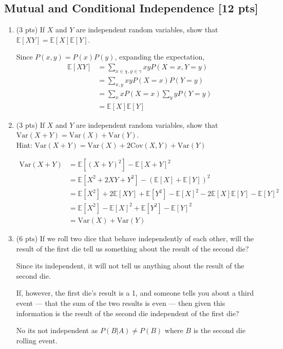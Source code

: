\documentclass[a4paper]{article}
\theoremstyle{definition}
\newcommand{\Var}{\mathrm{Var}}
\newcommand{\Cov}{\mathrm{Cov}}
\newenvironment{soln}{
	\leavevmode\color{blue}\ignorespaces
}{}
\begin{document}
	\subsection{Mutual and Conditional Independence [12 pts]}
	\begin{enumerate}
		\item (3 pts) If $X$ and $Y$ are independent random variables, show that
		$\mathbb{E}[XY] = \mathbb{E}[X]\mathbb{E}[Y]$.
		
		\begin{soln}
			Since $P(x,y) = P(x)P(y)$, expanding the expectation, 
			\begin{align*}
				\mathbb{E}[XY] &= \sum_{x \in \chi,y  \in \gamma} xyP(X=x, Y=y) \\
				&= \sum_{x,y} xyP(X=x)P(Y=y) \\
				&= \sum_{x} xP(X=x) \sum_{y} yP(Y=y) \\
				&= \mathbb{E}[X]\mathbb{E}[Y]
			\end{align*}
		\end{soln}
		
		\item (3 pts) If $X$ and $Y$ are independent random variables, show that
		$\Var(X+Y) = \Var(X) + \Var(Y)$. \\
		Hint: $\Var(X+Y) = \Var(X) + 2\Cov(X, Y) + \Var(Y)$
		
		\begin{soln}
			\begin{align*}
				\Var(X+Y) &= \mathbb{E}[(X+Y)^2] - \mathbb{E}[X+Y]^2 \\
				&= \mathbb{E}[X^2 + 2XY + Y^2] - (\mathbb{E}[X] + \mathbb{E}[Y])^2 \\
				&= \mathbb{E}[X^2] + 2\mathbb{E}[XY] + \mathbb{E}[Y^2] - \mathbb{E}[X]^2 - 2\mathbb{E}[X]\mathbb{E}[Y] - \mathbb{E}[Y]^2 \\
				&= \mathbb{E}[X^2] - \mathbb{E}[X]^2 + \mathbb{E}[Y^2] - \mathbb{E}[Y]^2 \\
				&= \Var(X) + \Var(Y)
			\end{align*}
		\end{soln}
		
		\item (6 pts) If we roll two dice that behave independently of each
		other, will the result of the first die tell us something about the
		result of the second die? 
		
		\begin{soln}
			Since its independent, it will not tell us anything about the result of the second die.
		\end{soln}
		
		If, however, the first die's result is a 1,
		and someone tells you about a third event --- that the sum of the two
		results is even --- then given this information is the result of the second die
		independent of the first die? 
		
		\begin{soln}
			No its not independent as $P(B|A) \ne P(B)$ where $B$ is the second die rolling event.
		
		\end{soln}
	\end{enumerate}
	
\end{document}
